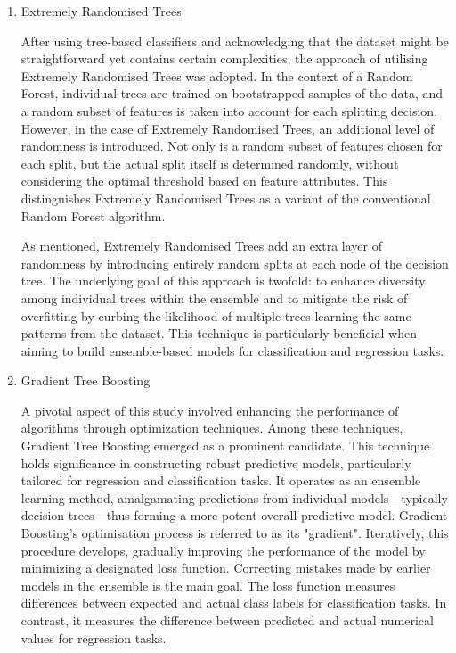 \documentclass[12pt]{article}
\begin{document}
\begin{enumerate}
\item Extremely Randomised Trees

After using tree-based classifiers and acknowledging that the dataset might be straightforward yet contains certain complexities, the approach of utilising Extremely Randomised Trees was adopted. In the context of a Random Forest, individual trees are trained on bootstrapped samples of the data, and a random subset of features is taken into account for each splitting decision. However, in the case of Extremely Randomised Trees, an additional level of randomness is introduced. Not only is a random subset of features chosen for each split, but the actual split itself is determined randomly, without considering the optimal threshold based on feature attributes. This distinguishes Extremely Randomised Trees as a variant of the conventional Random Forest algorithm.

As mentioned, Extremely Randomised Trees add an extra layer of randomness by introducing entirely random splits at each node of the decision tree. The underlying goal of this approach is twofold: to enhance diversity among individual trees within the ensemble and to mitigate the risk of overfitting by curbing the likelihood of multiple trees learning the same patterns from the dataset. This technique is particularly beneficial when aiming to build ensemble-based models for classification and regression tasks.

\item Gradient Tree Boosting

A pivotal aspect of this study involved enhancing the performance of algorithms through optimization techniques. Among these techniques, Gradient Tree Boosting emerged as a prominent candidate. This technique holds significance in constructing robust predictive models, particularly tailored for regression and classification tasks. It operates as an ensemble learning method, amalgamating predictions from individual models—typically decision trees—thus forming a more potent overall predictive model. Gradient Boosting's optimisation process is referred to as its "gradient". Iteratively, this procedure develops, gradually improving the performance of the model by minimizing a designated loss function. Correcting mistakes made by earlier models in the ensemble is the main goal. The loss function measures differences between expected and actual class labels for classification tasks. In contrast, it measures the difference between predicted and actual numerical values for regression tasks.


\end{enumerate}
\end{document}
